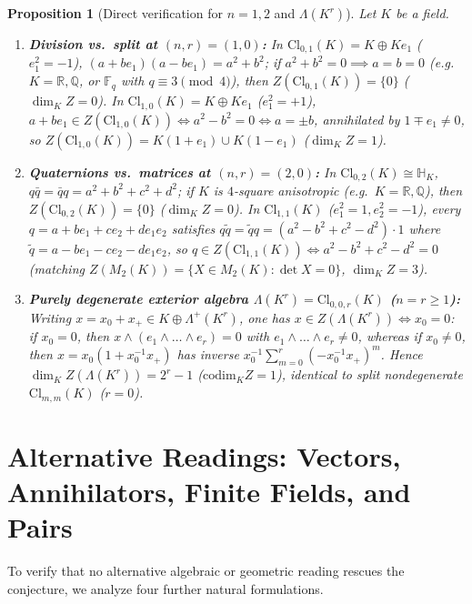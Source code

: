 \documentclass[11pt,a4paper]{article}
\newtheorem{proposition}[theorem]{Proposition}
\theoremstyle{definition}
\theoremstyle{remark}
\newcommand{\Cl}{\mathrm{Cl}}
\newcommand{\codim}{\mathrm{codim}}
\begin{document}
\begin{proposition}[Direct verification for $n = 1, 2$ and $\Lambda(K^r)$]\label{prop:direct}
Let $K$ be a field.
\begin{enumerate}
\setlength{\itemsep}{2pt}\setlength{\parskip}{0pt}
\item[(i)] \textbf{Division vs.\ split at $(n, r) = (1, 0)$:} In $\Cl_{0,1}(K) = K \oplus K e_1$ ($e_1^2 = -1$), $(a + b e_1)(a - b e_1) = a^2 + b^2$; if $a^2 + b^2 = 0 \implies a = b = 0$ (e.g.\ $K = \mathbb{R}, \mathbb{Q}$, or $\mathbb{F}_q$ with $q \equiv 3 \pmod 4$), then $Z(\Cl_{0,1}(K)) = \{0\}$ ($\dim_K Z = 0$). In $\Cl_{1,0}(K) = K \oplus K e_1$ ($e_1^2 = +1$), $a + b e_1 \in Z(\Cl_{1,0}(K)) \iff a^2 - b^2 = 0 \iff a = \pm b$, annihilated by $1 \mp e_1 \neq 0$, so $Z(\Cl_{1,0}(K)) = K(1 + e_1) \cup K(1 - e_1)$ ($\dim_K Z = 1$).
\item[(ii)] \textbf{Quaternions vs.\ matrices at $(n, r) = (2, 0)$:} In $\Cl_{0,2}(K) \cong \mathbb{H}_K$, $q \bar{q} = \bar{q} q = a^2 + b^2 + c^2 + d^2$; if $K$ is $4$-square anisotropic (e.g.\ $K = \mathbb{R}, \mathbb{Q}$), then $Z(\Cl_{0,2}(K)) = \{0\}$ ($\dim_K Z = 0$). In $\Cl_{1,1}(K)$ ($e_1^2 = 1, e_2^2 = -1$), every $q = a + b e_1 + c e_2 + d e_1 e_2$ satisfies $q \tilde{q} = \tilde{q} q = (a^2 - b^2 + c^2 - d^2)\cdot 1$ where $\tilde{q} = a - b e_1 - c e_2 - d e_1 e_2$, so $q \in Z(\Cl_{1,1}(K)) \iff a^2 - b^2 + c^2 - d^2 = 0$ (matching $Z(M_2(K)) = \{X \in M_2(K) : \det X = 0\}$, $\dim_K Z = 3$).
\item[(iii)] \textbf{Purely degenerate exterior algebra $\Lambda(K^r) = \Cl_{0,0,r}(K)$ ($n = r \ge 1$):} Writing $x = x_0 + x_+ \in K \oplus \Lambda^+(K^r)$, one has $x \in Z(\Lambda(K^r)) \iff x_0 = 0$: if $x_0 = 0$, then $x \wedge (e_1 \wedge \dots \wedge e_r) = 0$ with $e_1 \wedge \dots \wedge e_r \neq 0$, whereas if $x_0 \neq 0$, then $x = x_0(1 + x_0^{-1} x_+)$ has inverse $x_0^{-1}\sum_{m=0}^r (-x_0^{-1} x_+)^m$. Hence $\dim_K Z(\Lambda(K^r)) = 2^r - 1$ ($\codim_K Z = 1$), identical to split nondegenerate $\Cl_{m,m}(K)$ ($r = 0$).
\end{enumerate}
\end{proposition}

\section{Alternative Readings: Vectors, Annihilators, Finite Fields, and Pairs}

To verify that no alternative algebraic or geometric reading rescues the conjecture, we analyze four further natural formulations.
\end{document}

